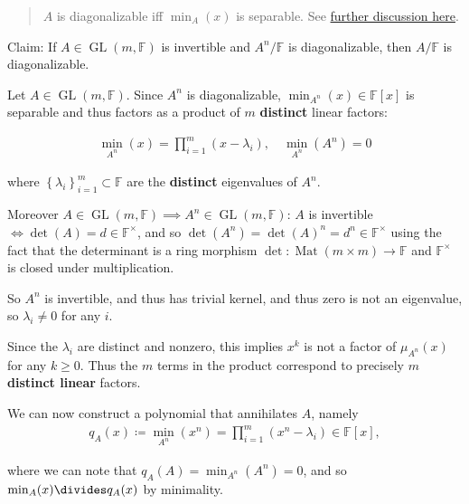 \begin{solution}

\begin{quote}
\(A\) is diagonalizable iff \(\min_A(x)\) is separable. See
\href{https://math.stackexchange.com/questions/3027664/if-a-is-invertible-and-an-is-diagonalizable-then-a-is-diagonalizable}{further
discussion here}.
\end{quote}

Claim: If \(A \in \operatorname{GL}(m, {\mathbb{F}})\) is invertible and
\(A^n/{\mathbb{F}}\) is diagonalizable, then \(A/{\mathbb{F}}\) is
diagonalizable.

Let \(A \in \operatorname{GL}(m, {\mathbb{F}})\). Since \(A^n\) is
diagonalizable, \(\min_{A^n}(x) \in {\mathbb{F}}[x]\) is separable and
thus factors as a product of \(m\) \textbf{distinct} linear factors:

\begin{align*}
\min_{A^n}(x) = \prod_{i=1}^m (x-\lambda_i), \quad \min_{A^n}(A^n) = 0
\end{align*}

where \(\left\{{\lambda_i}\right\}_{i=1}^m \subset {\mathbb{F}}\) are
the \textbf{distinct} eigenvalues of \(A^n\).

Moreover
\(A\in \operatorname{GL}(m,{\mathbb{F}}) \implies A^n \in \operatorname{GL}(m,{\mathbb{F}})\):
\(A\) is invertible \(\iff \det(A) = d \in {\mathbb{F}}^{\times}\), and
so \(\det(A^n) = \det(A)^n = d^n \in {\mathbb{F}}^{\times}\) using the
fact that the determinant is a ring morphism
\(\det: \operatorname{Mat}(m\times m) \to{\mathbb{F}}\) and
\({\mathbb{F}}^{\times}\) is closed under multiplication.

So \(A^n\) is invertible, and thus has trivial kernel, and thus zero is
not an eigenvalue, so \(\lambda_i \neq 0\) for any \(i\).

Since the \(\lambda_i\) are distinct and nonzero, this implies \(x^k\)
is not a factor of \(\mu_{A^n}(x)\) for any \(k\geq 0\). Thus the \(m\)
terms in the product correspond to precisely \(m\) \textbf{distinct
linear} factors.

We can now construct a polynomial that annihilates \(A\), namely
\begin{align*}
q_A(x) \coloneqq\min_{A^n}(x^n) = \prod_{i=1}^m (x^n-\lambda_i) \in {\mathbb{F}}[x],
\end{align*}

where we can note that \(q_A(A) = \min_{A^n}(A^n) = 0\), and so
\(\min_A(x) \divides q_A(x)\) by minimality.


\end{solution}
